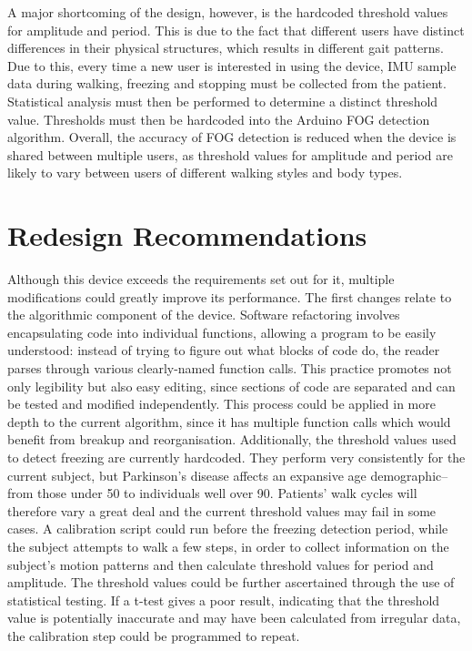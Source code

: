 \documentclass[titlepage]{article}
\begin{document}
\begin{doublespacing}
A major shortcoming of the design, however, is the hardcoded threshold values for amplitude and period. This is due to the fact that different users have distinct differences in their physical structures,  which results in different gait patterns. Due to this, every time a new user is interested in using the device, IMU sample data during walking, freezing and stopping must be collected from the patient. Statistical analysis must then be performed to determine a distinct threshold value. Thresholds must then be hardcoded into the Arduino FOG detection algorithm. Overall, the accuracy of FOG detection is reduced when the device is shared between multiple users, as threshold values for amplitude and period are likely to vary between users of different walking styles and body types.

\clearpage
\section{Redesign Recommendations}

Although this device exceeds the requirements set out for it, multiple modifications could greatly improve its performance. The first changes relate to the algorithmic component of the device. Software refactoring involves encapsulating code into individual functions, allowing a program to be easily understood: instead of trying to figure out what blocks of code do, the reader parses through various clearly-named function calls. This practice promotes not only legibility but also easy editing, since sections of code are separated and can be tested and modified independently. This process could be applied in more depth to the current algorithm, since it has multiple function calls which would benefit from breakup and reorganisation.
Additionally, the threshold values used to detect freezing are currently hardcoded. They perform very consistently for the current subject, but Parkinson's disease affects an expansive age demographic--from those under 50 to individuals well over 90. Patients' walk cycles will therefore vary a great deal and the current threshold values may fail in some cases. A calibration script could run before the freezing detection period, while the subject attempts to walk a few steps, in order to collect information on the subject's motion patterns and then calculate threshold values for period and amplitude. The threshold values could be further ascertained through the use of statistical testing. If a t-test gives a poor result, indicating that the threshold value is potentially inaccurate and may have been calculated from irregular data, the calibration step could be programmed to repeat.


\end{doublespacing}
\end{document}
